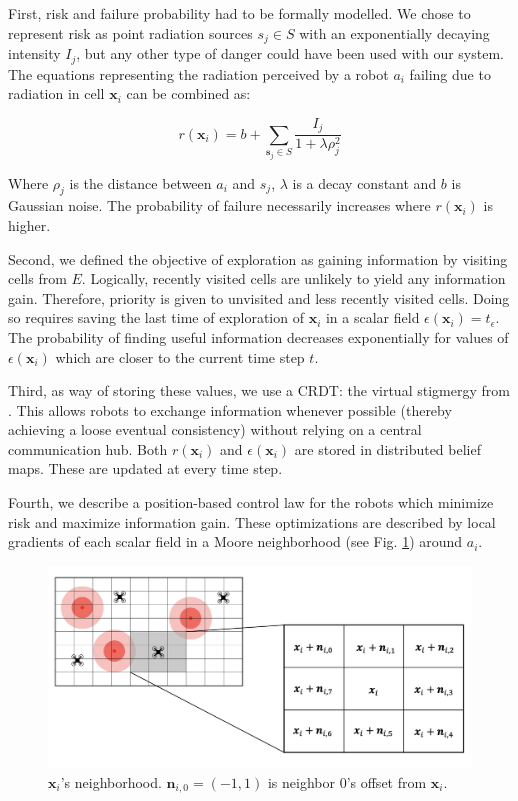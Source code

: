 \FloatBarrier

First, risk and failure probability had to be formally modelled. We chose to represent risk as point radiation sources $s_j \in S$ with an exponentially decaying intensity $I_j$, but any other type of danger could have been used with our system. The equations representing the radiation perceived by a robot $a_i$ failing due to radiation in cell $\bm{x}_i$ can be combined as:

\begin{equation}
    r(\bm{x}_i) = b + \sum_{\bm{s}_j \in S} \frac{I_j}{1 + \lambda\rho_j^2}
    \label{eq:radiation_dora}
\end{equation}

Where $\rho_j$ is the distance between $a_i$ and $s_j$, $\lambda$ is a decay constant and $b$ is Gaussian noise. The probability of failure necessarily increases where $r(\bm{x}_i)$ is higher.

Second, we defined the objective of exploration as gaining information by visiting cells from $E$. Logically, recently visited cells are unlikely to yield any information gain. Therefore, priority is given to unvisited and less recently visited cells. Doing so requires saving the last time of exploration of $\bm{x}_i$ in a scalar field $\epsilon(\bm{x}_i) = t_\epsilon$. The probability of finding useful information decreases exponentially for values of $\epsilon(\bm{x}_i)$ which are closer to the current time step $t$.

Third, as way of storing these values, we use a \ac{CRDT}: the virtual stigmergy from \cite{pinciroliTuple2016}. This allows robots to exchange information whenever possible (thereby achieving a loose eventual consistency) without relying on a central communication hub. Both $r(\bm{x}_i)$ and $\epsilon(\bm{x}_i)$ are stored in distributed belief maps. These are updated at every time step.

Fourth, we describe a position-based control law for the robots which minimize risk and maximize information gain. These optimizations are described by local gradients of each scalar field in a Moore neighborhood (see Fig. \ref{neighborhood}) around $a_i$.

\begin{figure}[htbp]
	\centering
    \includegraphics[width=0.95\columnwidth]{figures/dora_explorer/Moore.png}
    \caption[Moore neighborhood]{$\bm{x}_i$'s neighborhood. $\bm{n}_{i,0} = (-1, 1)$ is neighbor 0's offset from $\bm{x}_i$.}
    \label{neighborhood}
\end{figure}

